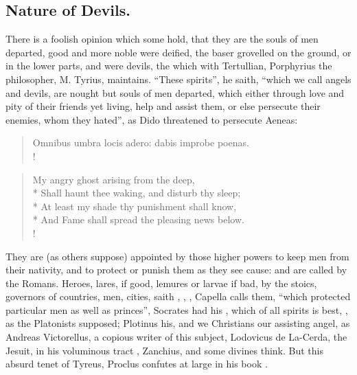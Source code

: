 \subsection{Nature of Devils.}

There is a foolish opinion which some hold, that they are the souls of men
departed, good and more noble were deified, the baser grovelled on the ground,
or in the lower parts, and were devils, the which with Tertullian, Porphyrius
the philosopher, M. Tyrius,  maintains. \enquote{These
spirits}, he saith, \enquote{which we call angels and devils, are
nought but souls of men departed, which either through love and pity of their
friends yet living, help and assist them, or else persecute their enemies, whom
they hated}, as Dido threatened to persecute Aeneas:

\begin{latin}
\begin{verse}%
Omnibus umbra locis adero: dabis improbe poenas.\\!
\end{verse}%
\end{latin}

\begin{verse}%
My angry ghost arising from the deep,\\*
Shall haunt thee waking, and disturb thy sleep;\\*
At least my shade thy punishment shall know,\\*
And Fame shall spread the pleasing news below.\\!
\end{verse}%

They are (as others suppose) appointed by those higher powers to keep men from
their nativity, and to protect or punish them as they see cause: and are called
 by the Romans. Heroes, lares, if good, lemures or
larvae if bad, by the stoics, governors of countries, men, cities, saith
\Apuleius, , \etc{} , Capella calls them,
\enquote{which protected particular men as well as princes}, Socrates had his
, which of all spirits is best, , as the Platonists supposed; Plotinus
his, and we Christians our assisting angel, as Andreas Victorellus, a copious
writer of this subject, Lodovicus de La-Cerda, the Jesuit, in his voluminous
tract , Zanchius, and some divines
think. But this absurd tenet of Tyreus, Proclus confutes at large in his book
.

